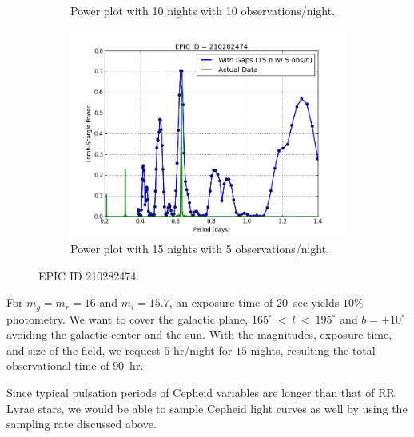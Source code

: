 \documentclass[letterpaper,11pt]{article}
\begin{document}
\begin{figure}[H]
\begin{subfigure}{.5\textwidth}
  \caption{Power plot with 10 nights with 10 observations/night.}
  \label{fig:1010}
  \end{subfigure}%
  \begin{subfigure}{.5\textwidth}
  \centering
  \includegraphics[width=.9\linewidth]{figures/1505Actual.png}
  \caption{Power plot with 15 nights with 5 observations/night.}
  \label{fig:1505}
\end{subfigure}
\caption{EPIC ID 210282474.}
\label{fig:EPIC}
\end{figure}


\noindent For $m_g = m_r = 16$ and $m_i = 15.7$, an exposure time of $20$~sec yields $10\%$ photometry. We want to cover the galactic plane, $165^{\circ}~<~l~<~195^{\circ}$ and $b=\pm10^{\circ}$ avoiding the galactic center and the sun. With the magnitudes, exposure time, and size of the field, we request $6$ hr/night for $15$ nights, resulting the total observational time of $90$~hr.  



\vspace{3mm} %


\noindent Since typical pulsation periods of Cepheid variables are longer than that of RR Lyrae stars, we would be able to sample Cepheid light curves as well by using the sampling rate discussed above. 
\end{document}
